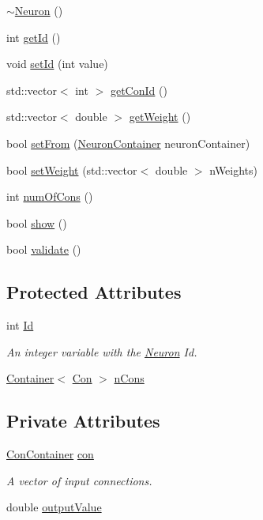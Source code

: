 \begin{DoxyCompactItemize}
\item 
\hyperlink{class_neuron_a94a250ce7e167760e593979b899745b1}{$\sim$Neuron} ()
\item 
int \hyperlink{class_neuron_ad9211d55ea50ad6dfbd2676b9e2335e4}{getId} ()
\item 
void \hyperlink{class_neuron_aa93290c13b40c5b07d92f272a0a2ce63}{setId} (int value)
\item 
std::vector$<$ int $>$ \hyperlink{class_neuron_acb4a225069611af4aa1723170e196e82}{getConId} ()
\item 
std::vector$<$ double $>$ \hyperlink{class_neuron_a8c0ab449acb35177af8d89651e49f357}{getWeight} ()
\item 
bool \hyperlink{class_neuron_ac8129f5de3ec1c143f40d507b6843649}{setFrom} (\hyperlink{class_neuron_container}{NeuronContainer} neuronContainer)
\item 
bool \hyperlink{class_neuron_a93b27c179c576758ff437b9273b95041}{setWeight} (std::vector$<$ double $>$ nWeights)
\item 
int \hyperlink{class_neuron_ae447dce39ed04581609a83d742b585d1}{numOfCons} ()
\item 
bool \hyperlink{class_neuron_a255c3597520c730d798218f7174eff1b}{show} ()
\item 
bool \hyperlink{class_neuron_a95327aa80a9ec949491f214a0c159b5a}{validate} ()
\end{DoxyCompactItemize}
\subsection*{Protected Attributes}
\begin{DoxyCompactItemize}
\item 
int \hyperlink{class_neuron_a72bb327a7c5c865e6748a4e074ce0680}{Id}
\begin{DoxyCompactList}\small\item\em An integer variable with the \hyperlink{class_neuron}{Neuron} Id. \end{DoxyCompactList}\item 
\hyperlink{class_container}{Container}$<$ \hyperlink{class_con}{Con} $>$ \hyperlink{class_neuron_a43be99a10c4508a8f7f3182129a3ab21}{nCons}
\end{DoxyCompactItemize}
\subsection*{Private Attributes}
\begin{DoxyCompactItemize}
\item 
\hyperlink{class_con_container}{ConContainer} \hyperlink{class_neuron_a1e92229eb19c3f322e118bdf23b9844e}{con}
\begin{DoxyCompactList}\small\item\em A vector of input connections. \end{DoxyCompactList}\item 
double \hyperlink{class_neuron_ada029047646c36e525a6a1b77cafc03c}{outputValue}
\end{DoxyCompactItemize}


